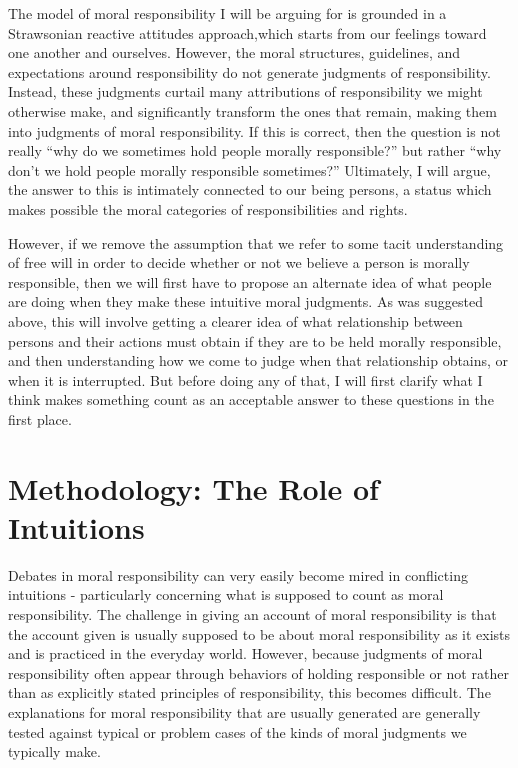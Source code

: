 \documentclass[phd,12pt,oneside,paper=letterpaper]{ubcthesis}
\begin{document}
The model of moral responsibility I will be arguing for is grounded in a Strawsonian reactive attitudes approach,which starts from our feelings toward one another and ourselves. However, the moral structures, guidelines, and expectations around responsibility do not generate judgments of responsibility. Instead, these judgments curtail many attributions of responsibility we might otherwise make, and significantly transform the ones that remain, making them into judgments of moral responsibility. If this is correct, then the question is not really ``why do we sometimes hold people morally responsible?'' but rather ``why don't we hold people morally responsible sometimes?'' Ultimately, I will argue, the answer to this is intimately connected to our being persons, a status which makes possible the moral categories of responsibilities and rights. 

However, if we remove the assumption that we refer to some tacit understanding of free will in order to decide whether or not we believe a person is morally responsible, then we will first have to propose an alternate idea of what people are doing when they make these intuitive moral judgments. As was suggested above, this will involve getting a clearer idea of what relationship between persons and their actions must obtain if they are to be held morally responsible, and then understanding how we come to judge when that relationship obtains, or when it is interrupted. But before doing any of that, I will first clarify what I think makes something count as an acceptable answer to these questions in the first place. 

\section{Methodology: The Role of Intuitions}
Debates in moral responsibility can very easily become mired in conflicting intuitions - particularly concerning what is supposed to count as moral responsibility. The challenge in giving an account of moral responsibility is that the account given is usually supposed to be about moral responsibility as it exists and is practiced in the everyday world. However, because judgments of moral responsibility often appear through behaviors of holding responsible or not rather than as explicitly stated principles of responsibility, this becomes difficult. The explanations for moral responsibility that are usually generated are generally tested against typical or problem cases of the kinds of moral judgments we typically make. 
\end{document}
